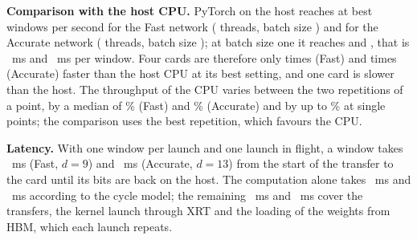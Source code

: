 \textbf{Comparison with the host CPU.} PyTorch on the host reaches at best \NumCpuFastBest{} windows per second for
the Fast network (\NumCpuFastBestThreads{} threads, batch size \NumCpuFastBestBatch{}) and \NumCpuAccurateBest{} for
the Accurate network (\NumCpuAccurateBestThreads{} threads, batch size \NumCpuAccurateBestBatch{}); at batch size one
it reaches \NumCpuFastOne{} and \NumCpuAccurateOne{}, that is \NumCpuFastOneMs{}~ms and \NumCpuAccurateOneMs{}~ms per
window. Four cards are therefore only \NumSpeedFast{} times (Fast) and \NumSpeedAcc{} times (Accurate) faster than the
host CPU at its best setting, and one card is slower than the host. The throughput of the CPU varies between the two
repetitions of a point, by a median of \NumCpuVarMedFast{}\% (Fast) and \NumCpuVarMedAccurate{}\% (Accurate) and by up
to \NumCpuVarMaxAccurate{}\% at single points; the comparison uses the best repetition, which favours the CPU.

\textbf{Latency.} With one window per launch and one launch in flight, a window takes \NumLatFast{}~ms (Fast, $d=9$)
and \NumLatAcc{}~ms (Accurate, $d=13$) from the start of the transfer to the card until its bits are back on the host.
The computation alone takes \NumComputeMsFast{}~ms and \NumComputeMsAcc{}~ms according to the cycle model; the
remaining \NumLatOverheadFast{}~ms and \NumLatOverheadAcc{}~ms cover the transfers, the kernel launch through XRT and
the loading of the weights from HBM, which each launch repeats.
